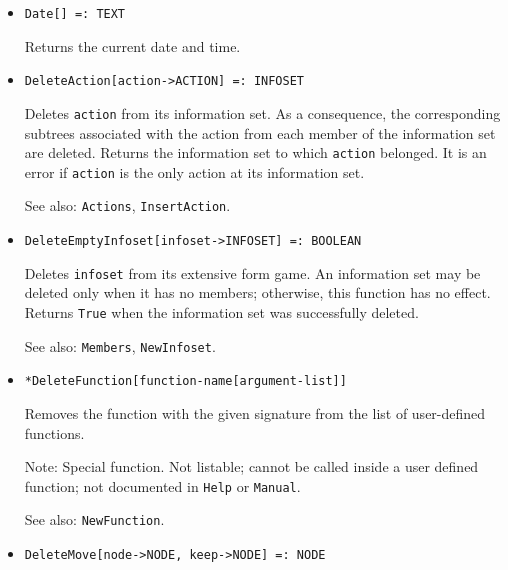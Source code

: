 \begin{itemize}

\item{}
\protect \large \begin{verbatim}
Date[] =: TEXT
\end{verbatim}\normalsize

\bd
Returns the current date and time. 
\ed

\item{}
\protect \large \begin{verbatim}
DeleteAction[action->ACTION] =: INFOSET
\end{verbatim}\normalsize

\bd
Deletes \verb+action+ from its information set. 
As a consequence, the corresponding subtrees associated
with the action from each member of the information set are deleted.
Returns the information set to which \verb+action+ belonged.  It is an
error if \verb+action+ is the only action at its information set.
\item [See also:] \verb+Actions+, \verb+InsertAction+.
\ed

\item{}
\protect \large \begin{verbatim}
DeleteEmptyInfoset[infoset->INFOSET] =: BOOLEAN
\end{verbatim}\normalsize

\bd
Deletes \verb+infoset+ from its extensive form game.  An information set
may be deleted only when it has no members; otherwise, this function has
no effect.  Returns \verb+True+ when the information set was successfully
deleted.
\item [See also:] \verb+Members+, \verb+NewInfoset+.
\ed

\item{}
\protect \large \begin{verbatim}
*DeleteFunction[function-name[argument-list]]
\end{verbatim}\normalsize

\bd
Removes the function with the given signature
from the list of user-defined functions.
\item [Note:] Special function. Not listable; cannot be called inside
a user defined function; not documented in \verb+Help+ or \verb+Manual+.  
\item [See also:] \verb+NewFunction+.
\ed

\item{}
\protect \large \begin{verbatim}
DeleteMove[node->NODE, keep->NODE] =: NODE
\end{verbatim}\normalsize


\end{itemize}
